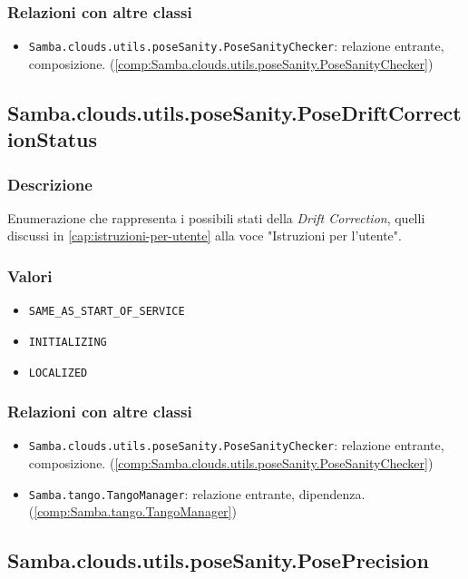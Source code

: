 \subsubsection{Relazioni con altre classi}
\begin{itemize}
	\item \texttt{Samba.clouds.utils.poseSanity.PoseSanityChecker}: relazione entrante, composizione. (\ref{comp:Samba.clouds.utils.poseSanity.PoseSanityChecker})
\end{itemize}

\subsection{Samba.clouds.utils.poseSanity.PoseDriftCorrectionStatus}\label{comp:Samba.clouds.utils.poseSanity.PoseDriftCorrectionStatus}
\subsubsection{Descrizione}
Enumerazione che rappresenta i possibili stati della \emph{Drift Correction}, quelli discussi in \ref{cap:istruzioni-per-utente} alla voce "Istruzioni per l'utente".
\subsubsection{Valori}
\begin{itemize}
	\item \texttt{SAME\_AS\_START\_OF\_SERVICE}
	\item \texttt{INITIALIZING}
	\item \texttt{LOCALIZED}		
\end{itemize}
\subsubsection{Relazioni con altre classi}
\begin{itemize}
	\item \texttt{Samba.clouds.utils.poseSanity.PoseSanityChecker}: relazione entrante, composizione. (\ref{comp:Samba.clouds.utils.poseSanity.PoseSanityChecker})
	\item \texttt{Samba.tango.TangoManager}: relazione entrante, dipendenza. (\ref{comp:Samba.tango.TangoManager})
\end{itemize}


\subsection{Samba.clouds.utils.poseSanity.PosePrecision}\label{comp:Samba.clouds.utils.poseSanity.PosePrecision}
